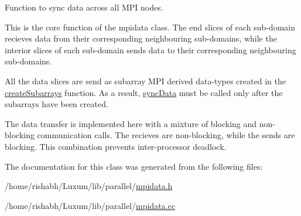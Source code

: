 Function to sync data across all M\+PI nodes. 

This is the core function of the mpidata class. The end slices of each sub-\/domain recieves data from their corresponding neighbouring sub-\/domains, while the interior slices of each sub-\/domain sends data to their corresponding neighbouring sub-\/domains.

All the data slices are send as subarray M\+PI derived data-\/types created in the \hyperlink{classmpidata_aebe34d26110d4efa596e8b836de09bf1}{create\+Subarrays} function. As a result, \hyperlink{classmpidata_a8c722bece264a65a06c1843ab0ae9ae3}{sync\+Data} must be called only after the subarrays have been created.

The data transfer is implemented here with a mixture of blocking and non-\/blocking communication calls. The recieves are non-\/blocking, while the sends are blocking. This combination prevents inter-\/processor deadlock. 

The documentation for this class was generated from the following files\+:\begin{DoxyCompactItemize}
\item 
/home/rishabh/\+Luxum/lib/parallel/\hyperlink{mpidata_8h}{mpidata.\+h}\item 
/home/rishabh/\+Luxum/lib/parallel/\hyperlink{mpidata_8cc}{mpidata.\+cc}\end{DoxyCompactItemize}
